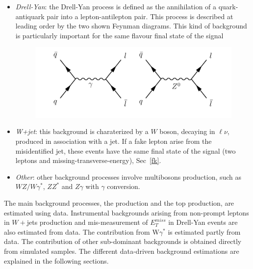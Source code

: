 \begin{itemize}
\begin{figure}[h]
\end{figure}
\item \textit{Drell-Yan}: the Drell-Yan process is defined as the annihilation of a quark-antiquark pair into a lepton-antilepton pair. This process is described at leading order by
the two  shown Feynman diagrams. %
This kind of background is particularly important for the same flavour final state of the signal
\begin{figure}[h]
\centering
\vspace{0.5cm}
\includegraphics[scale= 0.7]{../Cap5/dy}
\end{figure}

\item \textit{W+jet}: this background is charaterized by a $W$ boson, decaying in $\ell \nu$, produced in association with a jet. If a fake lepton arise from the misidentified jet, these events have  the same final state of the signal (two leptons and missing-transverse-energy), Sec~\ref{fk}. 

\item \textit{Other}: other background processes involve multibosons production, such as $WZ/W\gamma^*$, $ZZ^*$ and $Z\gamma$ with $\gamma$ conversion.

\end{itemize}
The main background processes, the \WW production and the top production, are estimated using data. 
Instrumental backgrounds arising from non-prompt leptons in $W+$jets production and mis-measurement of $E_T^{miss}$ in Drell-Yan events are also estimated from
data. The contribution from W$\gamma^*$  is estimated partly from data. The
contribution of other sub-dominant backgrounds is obtained directly from simulated samples. The different data-driven background estimations are explained in the following sections. 


